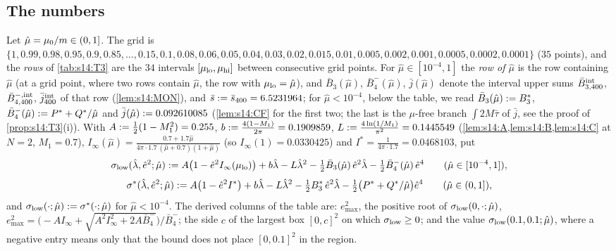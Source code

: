 
\subsection*{The numbers}

Let $\hat\mu=\mu_0/m\in(0,1]$. The grid is $\{1,0.99,0.98,0.95,0.9,0.85,\dots,0.15,0.1,0.08,0.06,0.05,0.04,0.03,0.02,0.015,0.01,0.005,0.002,0.001,0.0005,0.0002,0.0001\}$ ($35$ points), and the \emph{rows} of \cref{tab:s14:T3} are the $34$ intervals $[\mu_{\rm lo},\mu_{\rm hi}]$ between consecutive grid points. For $\hat\mu\in[10^{-4},1]$ the \emph{row of $\hat\mu$} is the row containing $\hat\mu$ (at a grid point, where two rows contain $\hat\mu$, the row with $\mu_{\rm lo}=\hat\mu$), and $\bar B_3(\hat\mu)$, $\bar B_4^-(\hat\mu)$, $\bar j(\hat\mu)$ denote the interval upper sums $\bar B^{\rm int}_{3,400}$, $\bar B^{-,{\rm int}}_{4,400}$, $\bar j^{\rm int}_{400}$ of that row (\cref{lem:s14:MON}), and $\bar s:=\bar s_{400}=6.5231964$; for $\hat\mu<10^{-4}$, below the table, we read $\bar B_3(\hat\mu):= B_3^*$, $\bar B_4^-(\hat\mu):= P^*+Q^*/\hat\mu$ and $\bar j(\hat\mu):=0.092610085$ (\cref{lem:s14:CF} for the first two; the last is the $\mu$-free branch $\int2M\bar\tau$ of $\bar j$, see the proof of \cref{prop:s14:T3}(i)). With $A:=\frac12(1-M_1^2)=0.255$, $b:=\frac{4(1-M_1)}{2\pi}=0.1909859$, $L:=\frac{4\ln(1/M_1)}{\pi^2}=0.1445549$ (\cref{lem:s14:A,lem:s14:B,lem:s14:C} at $N=2$, $M_1=0.7$), $I_\infty(\hat\mu)=\frac{0.7+1.7\hat\mu}{4\pi\cdot1.7\,(\hat\mu+0.7)(1+\hat\mu)}$ (so $I_\infty(1)=0.0330425$) and $I^*=\frac1{4\pi\cdot1.7}=0.0468103$, put
\begin{equation}\label{eq:s14:sigmalow}
\sigma_{\rm low}(\hat\lambda,\hat e^2;\hat\mu):= A\big(1-\hat e^2I_\infty(\mu_{\rm lo})\big)+b\hat\lambda-L\hat\lambda^2-\tfrac12\bar B_3(\hat\mu)\,\hat e^2\hat\lambda-\tfrac12\bar B_4^-(\hat\mu)\,\hat e^4\qquad(\hat\mu\in[10^{-4},1]),
\end{equation}
\begin{equation}\label{eq:s14:sigmastar}
\sigma^*(\hat\lambda,\hat e^2;\hat\mu):= A\big(1-\hat e^2I^*\big)+b\hat\lambda-L\hat\lambda^2-\tfrac12B_3^*\,\hat e^2\hat\lambda-\tfrac12\big(P^*+Q^*/\hat\mu\big)\hat e^4\qquad(\hat\mu\in(0,1]),
\end{equation}
and $\sigma_{\rm low}(\cdot;\hat\mu):=\sigma^*(\cdot;\hat\mu)$ for $\hat\mu<10^{-4}$. The derived columns of the table are: $e^2_{\max}$, the positive root of $\sigma_{\rm low}(0,\cdot;\hat\mu)$, $e^2_{\max}=\big(-AI_\infty+\sqrt{A^2I_\infty^2+2A\bar B_4^-}\big)/\bar B_4^-$; the side $c$ of the largest box $[0,c]^2$ on which $\sigma_{\rm low}\ge0$; and the value $\sigma_{\rm low}(0.1,0.1;\hat\mu)$, where a negative entry means only that the bound does not place $[0,0.1]^2$ in the region.

